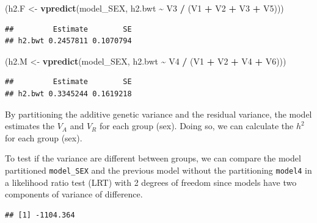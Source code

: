 \documentclass[
  12pt,
]{book}
\newenvironment{Shaded}{\begin{snugshade}}{\end{snugshade}}
\newcommand{\KeywordTok}[1]{\textcolor[rgb]{0.13,0.29,0.53}{\textbf{#1}}}
\newcommand{\NormalTok}[1]{#1}
\newcommand{\OperatorTok}[1]{\textcolor[rgb]{0.81,0.36,0.00}{\textbf{#1}}}
\newcommand{\StringTok}[1]{\textcolor[rgb]{0.31,0.60,0.02}{#1}}
\begin{document}
\begin{Shaded}
\begin{Highlighting}[]
\NormalTok{(h2.F \textless{}{-}}\StringTok{ }\KeywordTok{vpredict}\NormalTok{(model\_SEX, h2.bwt }\OperatorTok{\textasciitilde{}}\StringTok{ }\NormalTok{V3 }\OperatorTok{/}\StringTok{ }\NormalTok{(V1 }\OperatorTok{+}\StringTok{ }\NormalTok{V2 }\OperatorTok{+}\StringTok{ }\NormalTok{V3 }\OperatorTok{+}\StringTok{ }\NormalTok{V5)))}
\end{Highlighting}
\end{Shaded}

\begin{verbatim}
##         Estimate        SE
## h2.bwt 0.2457811 0.1070794
\end{verbatim}

\begin{Shaded}
\begin{Highlighting}[]
\NormalTok{(h2.M \textless{}{-}}\StringTok{ }\KeywordTok{vpredict}\NormalTok{(model\_SEX, h2.bwt }\OperatorTok{\textasciitilde{}}\StringTok{ }\NormalTok{V4 }\OperatorTok{/}\StringTok{ }\NormalTok{(V1 }\OperatorTok{+}\StringTok{ }\NormalTok{V2 }\OperatorTok{+}\StringTok{ }\NormalTok{V4 }\OperatorTok{+}\StringTok{ }\NormalTok{V6)))}
\end{Highlighting}
\end{Shaded}

\begin{verbatim}
##         Estimate        SE
## h2.bwt 0.3345244 0.1619218
\end{verbatim}

By partitioning the additive genetic variance and the residual variance, the model estimates the \(V_A\) and \(V_R\) for each group (sex). Doing so, we can calculate the \(h^2\) for each group (sex).

To test if the variance are different between groups, we can compare the model partitioned \texttt{model\_SEX} and the previous model without the partitioning \texttt{model4} in a likelihood ratio test (LRT) with 2 degrees of freedom since models have two components of variance of difference.

\begin{Shaded}
\end{Shaded}

\begin{verbatim}
## [1] -1104.364
\end{verbatim}
\end{document}
